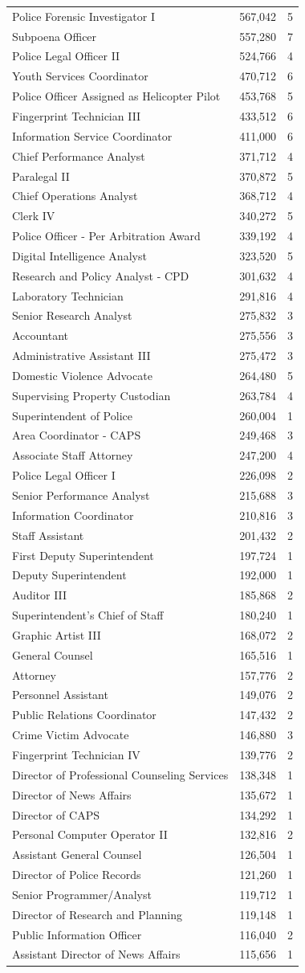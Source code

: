 \documentclass[
]{article}
\begin{document}
\begin{longtable}[]{@{}lcc@{}}
Police Forensic Investigator I & 567,042 & 5\tabularnewline
Subpoena Officer & 557,280 & 7\tabularnewline
Police Legal Officer II & 524,766 & 4\tabularnewline
Youth Services Coordinator & 470,712 & 6\tabularnewline
Police Officer Assigned as Helicopter Pilot & 453,768 & 5\tabularnewline
Fingerprint Technician III & 433,512 & 6\tabularnewline
Information Service Coordinator & 411,000 & 6\tabularnewline
Chief Performance Analyst & 371,712 & 4\tabularnewline
Paralegal II & 370,872 & 5\tabularnewline
Chief Operations Analyst & 368,712 & 4\tabularnewline
Clerk IV & 340,272 & 5\tabularnewline
Police Officer - Per Arbitration Award & 339,192 & 4\tabularnewline
Digital Intelligence Analyst & 323,520 & 5\tabularnewline
Research and Policy Analyst - CPD & 301,632 & 4\tabularnewline
Laboratory Technician & 291,816 & 4\tabularnewline
Senior Research Analyst & 275,832 & 3\tabularnewline
Accountant & 275,556 & 3\tabularnewline
Administrative Assistant III & 275,472 & 3\tabularnewline
Domestic Violence Advocate & 264,480 & 5\tabularnewline
Supervising Property Custodian & 263,784 & 4\tabularnewline
Superintendent of Police & 260,004 & 1\tabularnewline
Area Coordinator - CAPS & 249,468 & 3\tabularnewline
Associate Staff Attorney & 247,200 & 4\tabularnewline
Police Legal Officer I & 226,098 & 2\tabularnewline
Senior Performance Analyst & 215,688 & 3\tabularnewline
Information Coordinator & 210,816 & 3\tabularnewline
Staff Assistant & 201,432 & 2\tabularnewline
First Deputy Superintendent & 197,724 & 1\tabularnewline
Deputy Superintendent & 192,000 & 1\tabularnewline
Auditor III & 185,868 & 2\tabularnewline
Superintendent's Chief of Staff & 180,240 & 1\tabularnewline
Graphic Artist III & 168,072 & 2\tabularnewline
General Counsel & 165,516 & 1\tabularnewline
Attorney & 157,776 & 2\tabularnewline
Personnel Assistant & 149,076 & 2\tabularnewline
Public Relations Coordinator & 147,432 & 2\tabularnewline
Crime Victim Advocate & 146,880 & 3\tabularnewline
Fingerprint Technician IV & 139,776 & 2\tabularnewline
Director of Professional Counseling Services & 138,348 &
1\tabularnewline
Director of News Affairs & 135,672 & 1\tabularnewline
Director of CAPS & 134,292 & 1\tabularnewline
Personal Computer Operator II & 132,816 & 2\tabularnewline
Assistant General Counsel & 126,504 & 1\tabularnewline
Director of Police Records & 121,260 & 1\tabularnewline
Senior Programmer/Analyst & 119,712 & 1\tabularnewline
Director of Research and Planning & 119,148 & 1\tabularnewline
Public Information Officer & 116,040 & 2\tabularnewline
Assistant Director of News Affairs & 115,656 & 1\tabularnewline

\end{longtable}
\end{document}
